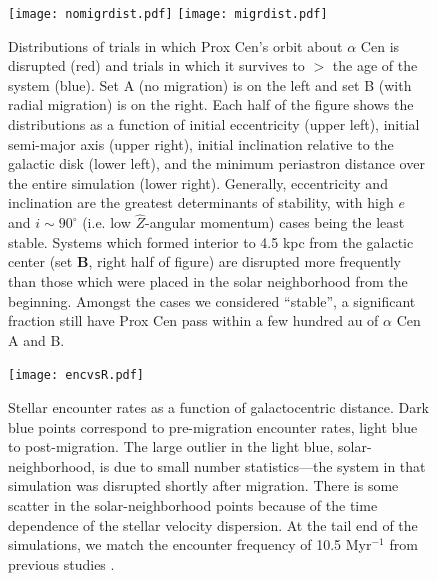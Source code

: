 \documentclass[preprint,12pt]{aastex}
\begin{document}
\begin{figure}
\texttt{[image: nomigrdist.pdf]}
\texttt{[image: migrdist.pdf]}
\caption{Distributions of trials in which Prox Cen's orbit about $\alpha$ Cen
  is disrupted (red) and trials in which it survives to $>$ the age of the 
  system (blue). Set {A} (no migration) is on the left and set {B} (with 
  radial migration) is on the right. Each half of the figure shows the 
  distributions as a function of initial eccentricity (upper left), initial 
  semi-major axis (upper right), initial inclination relative to the galactic 
  disk (lower left), and the minimum periastron distance over the entire 
  simulation (lower right). Generally, eccentricity and inclination are the 
  greatest determinants of stability, with high $e$ and $i \sim 90^{\circ}$ 
  (i.e. low $\hat{Z}$-angular momentum) cases being the least stable. 
  Systems which formed interior to 4.5 kpc from the galactic center 
  (set \textbf{B}, right half of figure) are disrupted more frequently than 
  those which were placed in the solar neighborhood from the beginning. 
  Amongst the cases we considered ``stable'', a significant fraction still 
  have Prox Cen pass within a few hundred au of $\alpha$ Cen A and B.}
\label{fig:galacdist}
\end{figure}


\begin{figure}
\texttt{[image: encvsR.pdf]}
\caption{Stellar encounter rates as a function of galactocentric distance.
  Dark blue points correspond to pre-migration encounter rates, light 
  blue to post-migration. The large outlier in the light blue, 
  solar-neighborhood, is due to small number statistics---the system 
  in that simulation was disrupted shortly after migration. There is some 
  scatter in the solar-neighborhood points because of the time dependence 
  of the stellar velocity dispersion. At the tail end of the simulations, we 
  match the encounter frequency of 10.5 Myr$^{-1}$ from previous 
  studies \citep{Garciasanchez2001,Rickman2008}.}
\label{fig:encrates}
\end{figure}

\end{document}
